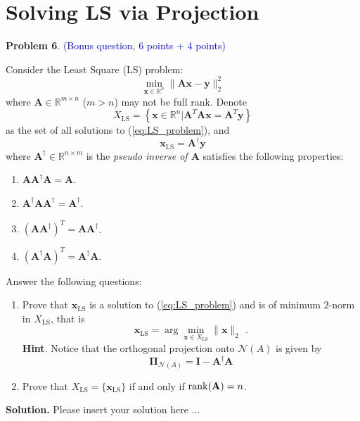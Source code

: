 \documentclass[english,onecolumn]{IEEEtran}
\begin{document}
\newpage
\section{Solving LS via Projection}
\noindent\textbf{Problem 6}. \textcolor{blue}{(Bonus question, 6 points + 4 points)}

Consider the Least Square (LS) problem:
\begin{equation}
    \label{eq:LS_problem}
    \min_{\mathbf{x}\in\mathbb{R}^n}\|\mathbf{A}\mathbf{x}-\mathbf{y}\|_2^2
\end{equation}
where $\mathbf{A}\in\mathbb{R}^{m\times n}$ ($m>n$) may not be full rank. Denote 
\begin{equation*}
    X_{\mathrm{LS}}=\left\{\mathbf{x}\in\mathbb{R}^n| \mathbf{A}^T\mathbf{A}\mathbf{x}=\mathbf{A}^T\mathbf{y}\right\}
\end{equation*}
as the set of all solutions to (\ref{eq:LS_problem}), and 
\begin{equation*}
    \mathbf{x}_{\mathrm{LS}}=\mathbf{A}^\dagger \mathbf{y}
\end{equation*}
where $\mathbf{A}^\dagger\in\mathbb{R}^{n\times m}$ is the \emph{pseudo inverse of $\mathbf{A}$} satisfies the following properties:
\begin{enumerate}
    \item $\mathbf{A}\mathbf{A}^\dagger\mathbf{A}=\mathbf{A}$.
    \item $\mathbf{A}^\dagger\mathbf{A}\mathbf{A}^\dagger=\mathbf{A}^\dagger$.
    \item $(\mathbf{A}\mathbf{A}^\dagger)^T=\mathbf{A}\mathbf{A}^\dagger$.
    \item $(\mathbf{A}^\dagger\mathbf{A})^T=\mathbf{A}^\dagger\mathbf{A}$.
\end{enumerate}

Answer the following questions:
\begin{enumerate}
    \item Prove that $\mathbf{x}_{\mathrm{LS}}$ is a solution to (\ref{eq:LS_problem}) and is of minimum $2$-norm in $X_{\mathrm{LS}}$, that is
    \begin{equation*}
        \mathbf{x}_{\mathrm{LS}}=\arg\min_{\mathbf{x}\in X_{\mathrm{LS}}}\|\mathbf{x}\|_2\  \,.
    \end{equation*}
    \textbf{Hint}. Notice that the orthogonal projection onto $\mathcal{N}(A)$ is given by
    \begin{equation*}
        \mathbf{\Pi}_{\mathcal{N}(A)}=\mathbf{I}-\mathbf{A}^\dagger\mathbf{A}
    \end{equation*}
    
    \item Prove that $X_{\mathrm{LS}}=\{\mathbf{x}_{\mathrm{LS}}\}$ if and only if $\mathrm{rank}({\bf A})=n$.
\end{enumerate}

\noindent
\textbf{Solution.}
Please insert your solution here ...
\end{document}
